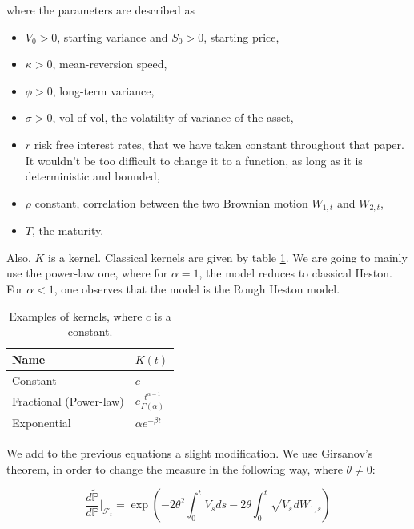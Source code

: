 where the parameters are described as
\begin{itemize}
\item $V_0 > 0$, starting variance and $S_0 > 0$, starting price,
\item $\kappa > 0$, mean-reversion speed,
\item $\phi >0$, long-term variance,
\item $\sigma > 0$, vol of vol, the volatility of variance of the asset,
\item $r$ risk free interest rates, that we have taken constant throughout that paper. It wouldn't be too difficult to change it to a function, as long as it is deterministic and bounded,
\item $\rho$ constant, correlation between the two Brownian motion $ W_{1,t}$ and $W_{2,t}$,
\item $T$, the maturity.
\end{itemize}

Also, $K$ is a kernel. Classical kernels are given by table \ref{tab:kernels}. We are going to mainly use the power-law one, where for $\alpha = 1$, the model reduces to classical Heston. For $\alpha < 1$, one observes that the model is the Rough Heston model.



\begin{table}
\begin{center}
\begin{tabular}{   m{4.5 cm}  m{4.5 cm}   } 
\hline
 Name  & $K(t)$  \\ 
\hline
Constant & $c$ \\ 
Fractional (Power-law) & $c \frac{t^{\alpha - 1}} {\Gamma(\alpha) }$ \\ 
Exponential & $\alpha e^{-\beta t }$ \\
\hline
\end{tabular}
\caption{Examples of kernels, where $c$ is a constant.}
\label{tab:kernels}
\end{center}
\end{table}


We add to the previous equations a slight modification. We use Girsanov's theorem, in order to change the measure in the following way, where $\theta \neq 0$:


\begin{equation}
\frac{d \mathbb {\widetilde P} } { d \mathbb P} \bigg\rvert_{\mathcal F_t} = \exp \left ( - 2 \theta^2 \int_0^t V_s ds - 2 \theta \int_0^t \sqrt{V_s} d W_{1,s}  \right )
\end{equation}


